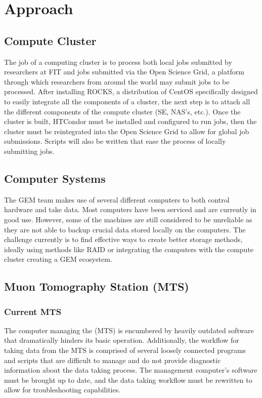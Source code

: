 \documentclass[12pt]{article}
\newcommand\tab[1][1cm]{\hspace*{#1}}
\begin{document}
\section{Approach}
	\subsection{Compute Cluster}
\tab The job of a computing cluster is to process both local jobs
submitted by researchers at FIT and jobs submitted via the Open
Science Grid, a platform through which researchers from around
the world may submit jobs to be processed. After installing
ROCKS, a distribution of CentOS specifically designed to easily
integrate all the components of a cluster, the next
step is to attach all the different components
of the compute cluster (SE, NAS's, etc.). Once the cluster is built,
HTCondor must be installed and configured to run jobs, then the
cluster must be reintegrated into the Open Science Grid to allow
for global job submissions. Scripts will also be written that ease
the process of locally submitting jobs.
	\subsection{Computer Systems}
		\tab The GEM team makes use of several different computers to
		both control hardware and take data. Most computers have been serviced
		and are currently in good use. However, some of the machines are
		still considered to be unreliable as they are not able to backup
		crucial data stored locally on the computers. The challenge currently
		is to find effective ways to create better storage methods, ideally
		using methods like RAID or integrating the computers with the compute
		cluster creating a GEM ecosystem.
	\subsection{Muon Tomography Station (MTS)}
		\subsubsection{Current MTS}
\tab The computer managing the (MTS) is encumbered by heavily outdated software that dramatically hinders its basic operation. Additionally, the workflow for taking data from the MTS is
comprised of several loosely connected programs and scripts that
are difficult to manage and do not provide diagnostic information
about the data taking process. The management computer’s software must be brought up to date, and the data taking workflow must be rewritten to allow for troubleshooting capabilities.
\end{document}
